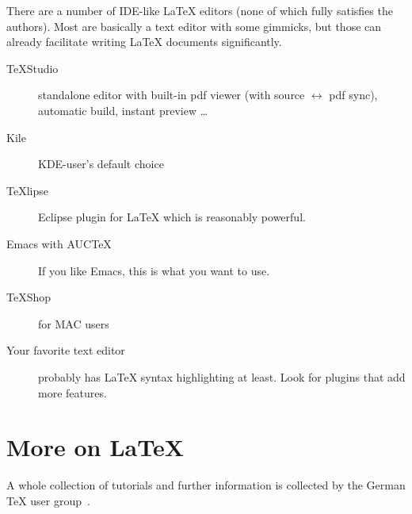 \documentclass[]{tukseminar}
\begin{document}
There are a number of IDE-like \LaTeX{} editors (none of which fully satisfies the authors).
Most are basically a text editor with some gimmicks, but those can already facilitate writing \LaTeX{} documents significantly.
\begin{description}
	\item[TeXStudio] standalone editor with built-in pdf viewer
	(with source $\leftrightarrow$ pdf sync), automatic build, instant preview \dots
	\item[Kile] KDE-user's default choice
	\item[TeXlipse] Eclipse plugin for \LaTeX{} which is reasonably powerful.
	\item[Emacs with AUCTeX] If you like Emacs, this is what you want to use.
	\item[TeXShop] for MAC users
	\item[Your favorite text editor] probably has \LaTeX{} syntax highlighting at least.
	  Look for plugins that add more features.
\end{description}

\section{More on \LaTeX}
A whole collection of tutorials and further information is collected by the German \TeX{} user group~\cite{danteintro}.
\end{document}
